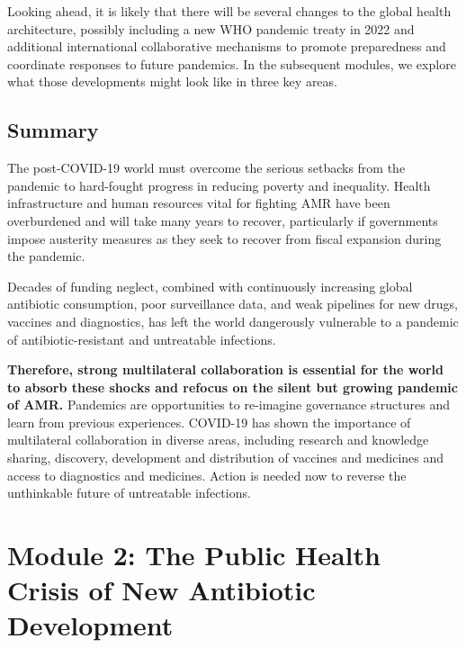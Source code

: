 \documentclass[
  11pt,
  paper=a4,
  ,captions=tableheading
]{scrartcl}
\begin{document}
Looking ahead, it is likely that there will be several changes to the
global health architecture, possibly including a new WHO pandemic treaty
in 2022 and additional international collaborative mechanisms to promote
preparedness and coordinate responses to future pandemics. In the
subsequent modules, we explore what those developments might look like
in three key areas.

\hypertarget{summary}{%
\subsection*{Summary}\label{summary}}

The post-COVID-19 world must overcome the serious setbacks from the
pandemic to hard-fought progress in reducing poverty and inequality.
Health infrastructure and human resources vital for fighting AMR have
been overburdened and will take many years to recover, particularly if
governments impose austerity measures as they seek to recover from
fiscal expansion during the pandemic.

Decades of funding neglect, combined with continuously increasing global
antibiotic consumption, poor surveillance data, and weak pipelines for
new drugs, vaccines and diagnostics, has left the world dangerously
vulnerable to a pandemic of antibiotic-resistant and untreatable
infections.

\textbf{Therefore, strong multilateral collaboration is essential for
the world to absorb these shocks and refocus on the silent but growing
pandemic of AMR.} Pandemics are opportunities to re-imagine governance
structures and learn from previous experiences. COVID-19 has shown the
importance of multilateral collaboration in diverse areas, including
research and knowledge sharing, discovery, development and distribution
of vaccines and medicines and access to diagnostics and medicines.
Action is needed now to reverse the unthinkable future of untreatable
infections.

\hypertarget{module-2-the-public-health-crisis-of-new-antibiotic-development}{%
\section*{Module 2: The Public Health Crisis of New Antibiotic
Development}\label{module-2-the-public-health-crisis-of-new-antibiotic-development}}
\end{document}
